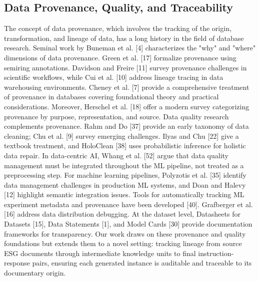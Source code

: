 \documentclass[9pt,twocolumn]{extarticle}
\begin{document}
\subsection{Data Provenance, Quality, and Traceability}
The concept of data provenance, which involves the tracking of the
origin, transformation, and lineage of data, has a long history in the
field of database research. Seminal work by Buneman et al.
[4] characterizes the "why" and "where" dimensions
of data provenance. Green et al. [17] formalize
provenance using semiring annotations. Davidson and Freire
[11] survey provenance challenges in scientific
workflows, while Cui et al. [10] address lineage
tracing in data warehousing environments. Cheney et al.
[7] provide a comprehensive treatment of
provenance in databases covering foundational theory and practical
considerations. Moreover, Herschel et al. [18]
offer a modern survey categorizing provenance by purpose,
representation, and source.
Data quality research complements provenance. Rahm and Do
[37] provide an early taxonomy of data cleaning;
Chu et al. [9] survey emerging challenges. Ilyas
and Chu [22] give a textbook treatment, and
HoloClean [38] uses probabilistic inference for
holistic data repair. In data-centric AI, Whang et al.
[52] argue that data quality management must be
integrated throughout the ML pipeline, not treated as a preprocessing
step.
For machine learning pipelines, Polyzotis et al.
[35] identify data management challenges in
production ML systems, and Doan and Halevy [12]
highlight semantic integration issues. Tools for automatically tracking
ML experiment metadata and provenance have been developed
[40]. Grafberger et al.
[16] address data distribution debugging. At the
dataset level, Datasheets for Datasets [15], Data
Statements [1], and Model Cards
[30] provide documentation frameworks for
transparency.
Our work draws on these provenance and quality foundations but extends
them to a novel setting: tracking lineage from source ESG documents
through intermediate knowledge units to final instruction-response
pairs, ensuring each generated instance is auditable and traceable to
its documentary origin.
\end{document}
